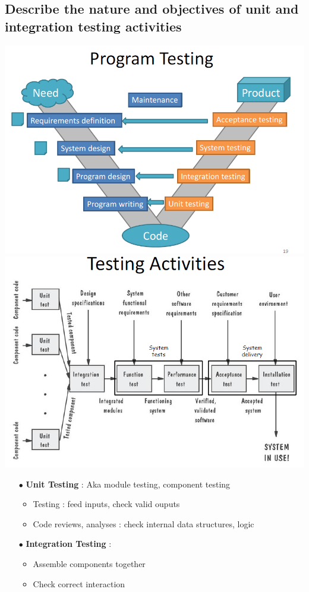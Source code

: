 \documentclass{article}
\begin{document}
\subsection{Describe the nature and objectives of unit and integration testing activities}

\begin{center}
    \includegraphics[scale=0.4]{image/53.PNG}
    \includegraphics[scale=0.4]{image/54.PNG}
\end{center}

\begin{multicols}{2}
\begin{itemize}
    \item [$\bullet$]\textbf{Unit Testing} : Aka module testing, component testing
    \begin{itemize}
        \item Testing : feed inputs, check valid ouputs
        \item Code reviews, analyses : check internal data structures, logic 
    \end{itemize}
    \item [$\bullet$]\textbf{Integration Testing} : 
    \begin{itemize}
        \item Assemble components together
        \item Check correct interaction
    \end{itemize}
\end{itemize}
\vfill\null
\end{multicols}
\end{document}
